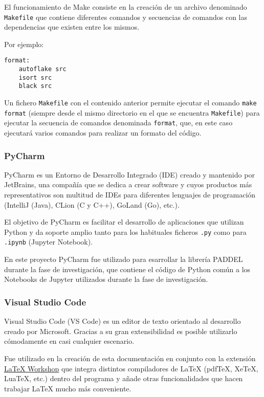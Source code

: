 El funcionamiento de Make consiste en la creación de un archivo denominado
\texttt{Makefile} que contiene diferentes comandos y secuencias de comandos con
las dependencias que existen entre los mismos.

Por ejemplo:

\begin{verbatim}
format:
    autoflake src
    isort src
    black src
\end{verbatim}

Un fichero \texttt{Makefile} con el contenido anterior permite ejecutar el
comando \texttt{make format} (siempre desde el mismo directorio en el que se
encuentra \texttt{Makefile}) para ejecutar la secuencia de comandos denominada
\texttt{format}, que, en este caso ejecutará varios comandos para realizar un
formato del código.

\subsubsection{PyCharm}

PyCharm es un Entorno de Desarrollo Integrado (IDE) creado y mantenido por
JetBrains, una compañía que se dedica a crear software y cuyos productos más
representativos son multitud de IDEs para diferentes lenguajes de programación
(IntelliJ (Java), CLion (C y C++), GoLand (Go), etc.).

El objetivo de PyCharm es facilitar el desarrollo de aplicaciones que utilizan
Python y da soporte amplio tanto para los habituales ficheros \texttt{.py} como
para \texttt{.ipynb} (Jupyter Notebook).

En este proyecto PyCharm fue utilizado para esarrollar la librería PADDEL
durante la fase de investigación, que contiene el código de Python común a los
Notebooks de Jupyter utilizados durante la fase de investigación.

\subsubsection{Visual Studio Code}

Visual Studio Code (VS Code) es un editor de texto orientado al desarrollo
creado por Microsoft. Gracias a su gran extensibilidad es posible utilizarlo
cómodamente en casi cualquier escenario.

Fue utilizado en la creación de esta documentación en conjunto con la extensión
\href{https://github.com/James-Yu/LaTeX-Workshop}{\LaTeX{} Workshop} que integra
distintos compiladores de \LaTeX{} (pdfTeX, XeTeX, LuaTeX, etc.) dentro del
programa y añade otras funcionalidades que hacen trabajar \LaTeX{} mucho más
conveniente.

